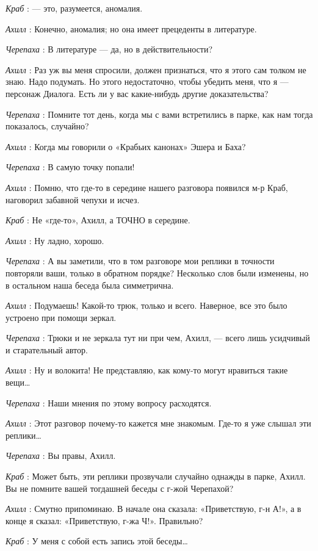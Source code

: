 \documentclass[../main.tex]{subfiles}
\begin{document}
\begin{dialogue}
\emph{Краб} : --- это, разумеется, аномалия.

\emph{Ахилл} : Конечно, аномалия; но она имеет прецеденты в литературе.

\emph{Черепаха} : В литературе --- да, но в действительности?

\emph{Ахилл} : Раз уж вы меня спросили, должен признаться, что я этого сам толком не знаю. Надо подумать. Но этого недостаточно, чтобы убедить меня, что я --- персонаж Диалога. Есть ли у вас какие-нибудь другие доказательства?

\emph{Черепаха} : Помните тот день, когда мы с вами встретились в парке, как нам тогда показалось, случайно?

\emph{Ахилл} : Когда мы говорили о «Крабьих канонах» Эшера и Баха?

\emph{Черепаха} : В самую точку попали!

\emph{Ахилл} : Помню, что где-то в середине нашего разговора появился м-р Краб, наговорил забавной чепухи и исчез.

\emph{Краб} : Не «где-то», Ахилл, а ТОЧНО в середине.

\emph{Ахилл} : Ну ладно, хорошо.

\emph{Черепаха} : А вы заметили, что в том разговоре мои реплики в точности повторяли ваши, только в обратном порядке? Несколько слов были изменены, но в остальном наша беседа была симметрична.

\emph{Ахилл} : Подумаешь! Какой-то трюк, только и всего. Наверное, все это было устроено при помощи зеркал.

\emph{Черепаха} : Трюки и не зеркала тут ни при чем, Ахилл, --- всего лишь усидчивый и старательный автор.

\emph{Ахилл} : Ну и волокита! Не представляю, как кому-то могут нравиться такие вещи\ldots{}

\emph{Черепаха} : Наши мнения по этому вопросу расходятся.

\emph{Ахилл} : Этот разговор почему-то кажется мне знакомым. Где-то я уже слышал эти реплики\ldots{}

\emph{Черепаха} : Вы правы, Ахилл.

\emph{Краб} : Может быть, эти реплики прозвучали случайно однажды в парке, Ахилл. Вы не помните вашей тогдашней беседы с г-жой Черепахой?

\emph{Ахилл} : Смутно припоминаю. В начале она сказала: «Приветствую, г-н А!», а в конце я сказал: «Приветствую, г-жа Ч!». Правильно?

\emph{Краб} : У меня с собой есть запись этой беседы\ldots{}


\end{dialogue}
\end{document}
